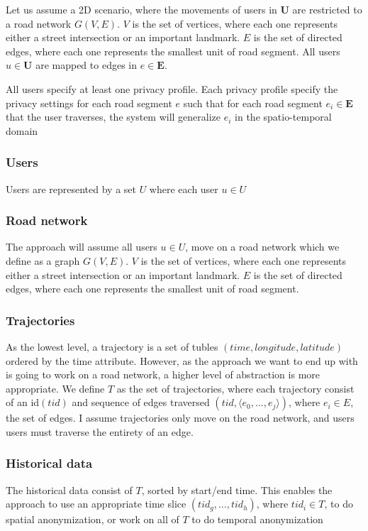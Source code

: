 Let us assume a 2D scenario, where the movements of users in $\mathbf{U}$ are restricted to a road network 
$G(V,E)$. $V$ is the set of vertices, where each one represents either a street intersection or an important 
landmark. $E$ is the set of directed edges, where each one represents the smallest unit of road segment. All
users $u \in \mathbf{U}$ are mapped to edges in $e \in \mathbf{E}$.

All users specify at least one privacy profile. Each privacy profile specify the privacy settings for each road segment $e$
such that for each road segment $e_i \in \mathbf{E}$ that the user traverses, the system will generalize $e_i$ in 
the spatio-temporal domain



\subsubsection{Users}
Users are represented by a set $U$ where each user $u \in U$

\subsubsection{Road network}
The approach will assume all users $u \in U$, move on a road network which we define as a graph $G(V,E)$. $V$ is the set
of vertices, where each one represents either a street intersection or an important landmark. $E$ is the
set of directed edges, where each one represents the smallest unit of road segment. 

\subsubsection{Trajectories}
As the lowest level, a trajectory is a set of tubles $(time,longitude,latitude)$ ordered by the time attribute. 
However, as the approach we want to end up with is going to work on a road network, a 
higher level of abstraction is more appropriate. We define $T$ as the set of trajectories, where each trajectory 
consist of an id$(tid)$ and sequence of edges traversed $(tid, \langle e_0,\ldots,e_j \rangle)$, where $e_i \in E$,
the set of edges. I assume trajectories only move on the road network, and users users must traverse the entirety
of an edge. 

\subsubsection{Historical data}
The historical data consist of $T$, sorted by start/end time. This enables the approach to use
an appropriate time slice $(tid_g,\ldots,tid_h)$, where $tid_i \in T$, to do spatial anonymization, or work on all of $T$
to do temporal anonymization


